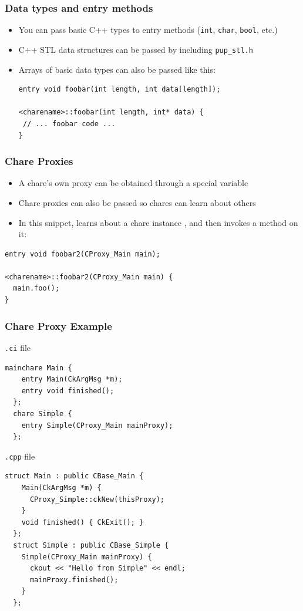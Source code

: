 \begin{frame}[fragile]
  \frametitle{Data types and entry methods}
\begin{itemize}
  \item You can pass basic C++ types to entry methods (\texttt{int},
    \texttt{char}, \texttt{bool}, etc.)
  \item C++ STL data structures can be passed by including \texttt{pup\_stl.h}
  \item Arrays of basic data types can also be passed like this:\\
\begin{lstlisting}
entry void foobar(int length, int data[length]);

<charename>::foobar(int length, int* data) {
 // ... foobar code ...
}
\end{lstlisting}
\end{itemize}
\end{frame}

\begin{frame}[fragile]
  \frametitle{Chare Proxies}
  \begin{itemize}
  \item A chare's own proxy can be obtained through a special variable
  \item Chare proxies can also be passed so chares can learn about others
  \item In this snippet,  learns about a chare instance
    , and then invokes a method on it:
  \end{itemize}
\begin{lstlisting}
entry void foobar2(CProxy_Main main);

<charename>::foobar2(CProxy_Main main) {
  main.foo();
}
\end{lstlisting}
\end{frame}

\begin{frame}[fragile]
  \frametitle{Chare Proxy Example}
\texttt{.ci} file
\begin{lstlisting}[basicstyle=\tiny]
  mainchare Main {
    entry Main(CkArgMsg *m);
    entry void finished();
  };
  chare Simple {
    entry Simple(CProxy_Main mainProxy);
  };
\end{lstlisting}
\texttt{.cpp} file
\begin{lstlisting}[basicstyle=\tiny]
  struct Main : public CBase_Main {
    Main(CkArgMsg *m) {
      CProxy_Simple::ckNew(thisProxy);      
    }
    void finished() { CkExit(); }
  };
  struct Simple : public CBase_Simple {
    Simple(CProxy_Main mainProxy) {
      ckout << "Hello from Simple" << endl;
      mainProxy.finished();
    }
  };
\end{lstlisting}
\end{frame}

